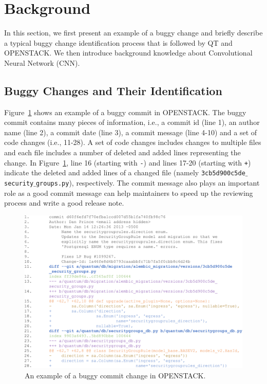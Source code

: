 

\section{Background}
\label{sec:background}

In this section, we first present an example of a buggy  change and briefly describe a typical buggy change identification process that is followed by QT and OPENSTACK. We then introduce background knowledge about Convolutional Neural Network (CNN). 

\subsection{Buggy Changes and Their Identification}
\label{sec:examle}

Figure~\ref{fig:example} shows an example of a buggy commit in OPENSTACK. The buggy commit contains many pieces of information, i.e., a commit id (line 1), an author name (line 2), a commit date (line 3), a commit message (line 4-10) and a set of code changes (i.e., 11-28). A set of code changes includes changes to multiple files and each file includes a number of deleted and added lines representing the change. In Figure~\ref{fig:example}, line 16 (starting with \texttt{-}) and lines 17-20 (starting with \texttt{+}) indicate the deleted and added lines of a changed file (namely \texttt{3cb5d900c5de$\_$security$\_$groups.py}), respectively. The commit message also plays an important role as a good commit message can help maintainers to speed up the reviewing process and write a good release note.

\begin{figure}[ht]
\center
\includegraphics[scale=0.2]{figs/example.pdf}
\caption{An example of a buggy commit change in OPENSTACK.}
\label{fig:example}
\end{figure} 

